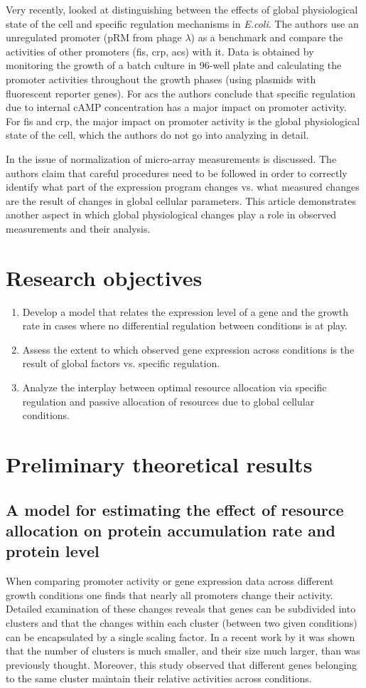 \documentclass[a4page,notitlepage]{article}
\begin{document}
Very recently, \parencite{Berthoumieux2013} looked at distinguishing between the effects of global physiological state of the cell and specific regulation mechanisms in \emph{E.coli}.
The authors use an unregulated promoter (pRM from phage $\lambda$) as a benchmark and compare the activities of other promoters (fis, crp, acs) with it.
Data is obtained by monitoring the growth of a batch culture in 96-well plate and calculating the promoter activities throughout the growth phases (using plasmids with fluorescent reporter genes).
For acs the authors conclude that specific regulation due to internal cAMP concentration has a major impact on promoter activity.
For fis and crp, the major impact on promoter activity is the global physiological state of the cell, which the authors do not go into analyzing in detail.

In \parencite{loven2012} the issue of normalization of micro-array measurements is discussed.
The authors claim that careful procedures need to be followed in order to correctly identify what part of the expression program changes vs. what measured changes are the result of changes in global cellular parameters.
This article demonstrates another aspect in which global physiological changes play a role in observed measurements and their analysis.

\section{Research objectives}
\begin{enumerate}
\item Develop a model that relates the expression level of a gene and the growth rate in cases where no differential regulation between conditions is at play.
\item Assess the extent to which observed gene expression across conditions is the result of global factors vs. specific regulation.
\item Analyze the interplay between optimal resource allocation via specific regulation and passive allocation of resources due to global cellular conditions.
\end{enumerate}
\section{Preliminary theoretical results}
\subsection{A model for estimating the effect of resource allocation on protein accumulation rate and protein level}
When comparing promoter activity or gene expression data across different growth conditions one finds that nearly all promoters change their activity.
Detailed examination of these changes reveals that genes can be subdivided into clusters and that the changes within each cluster (between two given conditions) can be encapsulated by a single scaling factor.
In a recent work by \parencite{Leeat2013} it was shown that the number of clusters is much smaller, and their size much larger, than was previously thought.
Moreover, this study observed that different genes belonging to the same cluster maintain their relative activities across conditions.
\end{document}
